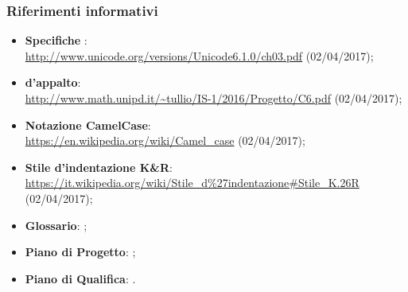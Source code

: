 \documentclass[../NormeDiProgetto.tex]{subfiles}
\begin{document}
			\subsubsection{Riferimenti informativi}	
				\begin{itemize}
					\item \textbf{Specifiche }:\\
					\url{http://www.unicode.org/versions/Unicode6.1.0/ch03.pdf} (02/04/2017);
					\item \textbf{ d'appalto}:\\
					\url{http://www.math.unipd.it/~tullio/IS-1/2016/Progetto/C6.pdf} (02/04/2017);
					\item \textbf{Notazione CamelCase}:\\
					\url{https://en.wikipedia.org/wiki/Camel_case} (02/04/2017);
					\item \textbf{Stile d'indentazione K\&R}:\\
					\url{https://it.wikipedia.org/wiki/Stile_d\%27indentazione#Stile_K.26R} (02/04/2017);
					\item \textbf{Glossario}: \glossariov;
					\item \textbf{Piano di Progetto}: \pianodiprogettov;
					\item \textbf{Piano di Qualifica}: \pianodiqualificav.
				\end{itemize}
\end{document}
